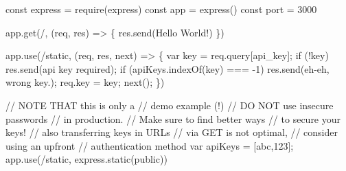 \documentclass[
  12pt,
  letterpaper,
]{krantz}
\newenvironment{Shaded}{\begin{snugshade}}{\end{snugshade}}
\newcommand{\AlertTok}[1]{\textcolor[rgb]{0.68,0.00,0.00}{#1}}
\newcommand{\AttributeTok}[1]{\textcolor[rgb]{0.40,0.45,0.13}{#1}}
\newcommand{\CommentTok}[1]{\textcolor[rgb]{0.37,0.37,0.37}{#1}}
\newcommand{\ControlFlowTok}[1]{\textcolor[rgb]{0.00,0.23,0.31}{#1}}
\newcommand{\DecValTok}[1]{\textcolor[rgb]{0.68,0.00,0.00}{#1}}
\newcommand{\FunctionTok}[1]{\textcolor[rgb]{0.28,0.35,0.67}{#1}}
\newcommand{\KeywordTok}[1]{\textcolor[rgb]{0.00,0.23,0.31}{#1}}
\newcommand{\NormalTok}[1]{\textcolor[rgb]{0.00,0.23,0.31}{#1}}
\newcommand{\OperatorTok}[1]{\textcolor[rgb]{0.37,0.37,0.37}{#1}}
\newcommand{\PreprocessorTok}[1]{\textcolor[rgb]{0.68,0.00,0.00}{#1}}
\newcommand{\StringTok}[1]{\textcolor[rgb]{0.13,0.47,0.30}{#1}}
\begin{document}
\begin{Shaded}
\begin{Highlighting}[]
\KeywordTok{const}\NormalTok{ express }\OperatorTok{=} \PreprocessorTok{require}\NormalTok{(}\StringTok{\textquotesingle{}express\textquotesingle{}}\NormalTok{)}
\KeywordTok{const}\NormalTok{ app }\OperatorTok{=} \FunctionTok{express}\NormalTok{()}
\KeywordTok{const}\NormalTok{ port }\OperatorTok{=} \DecValTok{3000}

\NormalTok{app}\OperatorTok{.}\FunctionTok{get}\NormalTok{(}\StringTok{\textquotesingle{}/\textquotesingle{}}\OperatorTok{,}\NormalTok{ (req}\OperatorTok{,}\NormalTok{ res) }\KeywordTok{=\textgreater{}}\NormalTok{ \{}
\NormalTok{  res}\OperatorTok{.}\FunctionTok{send}\NormalTok{(}\StringTok{\textquotesingle{}Hello World!\textquotesingle{}}\NormalTok{)}
\NormalTok{\})}

\NormalTok{app}\OperatorTok{.}\FunctionTok{use}\NormalTok{(}\StringTok{\textquotesingle{}/static\textquotesingle{}}\OperatorTok{,}\NormalTok{ (req}\OperatorTok{,}\NormalTok{ res}\OperatorTok{,}\NormalTok{ next) }\KeywordTok{=\textgreater{}}\NormalTok{ \{  }
  \KeywordTok{var}\NormalTok{ key }\OperatorTok{=}\NormalTok{ req}\OperatorTok{.}\AttributeTok{query}\NormalTok{[}\StringTok{\textquotesingle{}api\_key\textquotesingle{}}\NormalTok{]}\OperatorTok{;}
  \ControlFlowTok{if}\NormalTok{ (}\OperatorTok{!}\NormalTok{key) res}\OperatorTok{.}\FunctionTok{send}\NormalTok{(}\StringTok{\textquotesingle{}api key required\textquotesingle{}}\NormalTok{)}\OperatorTok{;}
  \ControlFlowTok{if}\NormalTok{ (apiKeys}\OperatorTok{.}\FunctionTok{indexOf}\NormalTok{(key) }\OperatorTok{===} \OperatorTok{{-}}\DecValTok{1}\NormalTok{)  res}\OperatorTok{.}\FunctionTok{send}\NormalTok{(}\StringTok{\textquotesingle{}eh{-}eh,}
\NormalTok{   wrong key}\OperatorTok{.}\StringTok{\textquotesingle{});}
\NormalTok{  req}\OperatorTok{.}\AttributeTok{key} \OperatorTok{=}\NormalTok{ key}\OperatorTok{;}
  \FunctionTok{next}\NormalTok{()}\OperatorTok{;}
\NormalTok{\})}


\CommentTok{// }\AlertTok{NOTE}\CommentTok{ THAT this is only a }
\CommentTok{// demo example (!)}
\CommentTok{// DO NOT use insecure passwords}
\CommentTok{// in production.}
\CommentTok{// Make sure to find better ways}
\CommentTok{// to secure your keys! }
\CommentTok{// also transferring keys in URLs}
\CommentTok{// via GET is not optimal, }
\CommentTok{// consider using an upfront}
\CommentTok{// authentication method}
\KeywordTok{var}\NormalTok{ apiKeys }\OperatorTok{=}\NormalTok{ [}\StringTok{\textquotesingle{}abc\textquotesingle{}}\OperatorTok{,}\StringTok{\textquotesingle{}123\textquotesingle{}}\NormalTok{]}\OperatorTok{;}
\NormalTok{app}\OperatorTok{.}\FunctionTok{use}\NormalTok{(}\StringTok{\textquotesingle{}/static\textquotesingle{}}\OperatorTok{,}\NormalTok{ express}\OperatorTok{.}\FunctionTok{static}\NormalTok{(}\StringTok{\textquotesingle{}public\textquotesingle{}}\NormalTok{))}


\end{Highlighting}
\end{Shaded}
\end{document}
